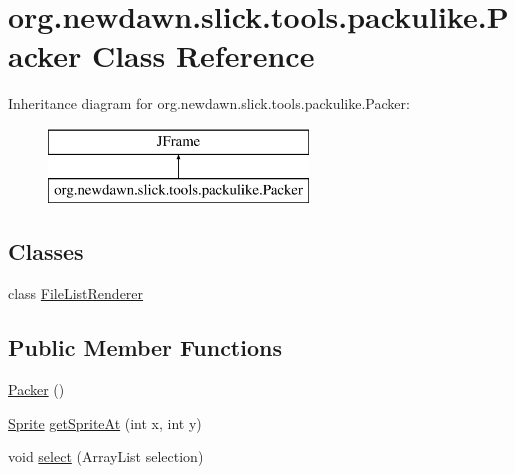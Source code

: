 \hypertarget{classorg_1_1newdawn_1_1slick_1_1tools_1_1packulike_1_1_packer}{}\section{org.\+newdawn.\+slick.\+tools.\+packulike.\+Packer Class Reference}
\label{classorg_1_1newdawn_1_1slick_1_1tools_1_1packulike_1_1_packer}
Inheritance diagram for org.\+newdawn.\+slick.\+tools.\+packulike.\+Packer\+:\begin{figure}[H]
\begin{center}
\leavevmode
\includegraphics[height=2.000000cm]{classorg_1_1newdawn_1_1slick_1_1tools_1_1packulike_1_1_packer}
\end{center}
\end{figure}
\subsection*{Classes}
\begin{DoxyCompactItemize}
\item 
class \mbox{\hyperlink{classorg_1_1newdawn_1_1slick_1_1tools_1_1packulike_1_1_packer_1_1_file_list_renderer}{File\+List\+Renderer}}
\end{DoxyCompactItemize}
\subsection*{Public Member Functions}
\begin{DoxyCompactItemize}
\item 
\mbox{\hyperlink{classorg_1_1newdawn_1_1slick_1_1tools_1_1packulike_1_1_packer_aea273a706568d7f6e6621a38d3ad694d}{Packer}} ()
\item 
\mbox{\hyperlink{classorg_1_1newdawn_1_1slick_1_1tools_1_1packulike_1_1_sprite}{Sprite}} \mbox{\hyperlink{classorg_1_1newdawn_1_1slick_1_1tools_1_1packulike_1_1_packer_a34ac2a1c7cef9dfc9dbef0cd3d636203}{get\+Sprite\+At}} (int x, int y)
\item 
void \mbox{\hyperlink{classorg_1_1newdawn_1_1slick_1_1tools_1_1packulike_1_1_packer_a7811f0b2c45bb43e48fb3edbb65115e3}{select}} (Array\+List selection)
\end{DoxyCompactItemize}
